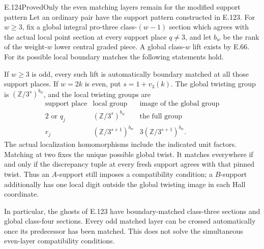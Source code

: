 \begin{result}{E.124}{Proved}{Only the even matching layers remain for the modified support pattern}
Let an ordinary pair have the support pattern constructed in E.123.
For $w\geq3$, fix a global integral pro-three class-$(w-1)$ section which agrees
with the actual local point section at every support place
$q\ne3$, and let $b_w$ be the rank of the weight-$w$ lower
central graded piece. A global class-$w$ lift exists by E.66.
For its possible local boundary matches the following statements
hold.

If $w\geq3$ is odd, every such lift is automatically boundary
matched at all those support places. If $w=2k$ is even, put
$s=1+v_3(k)$. The global twisting group is
$(\mathbb Z/3^s)^{b_w}$, and the local twisting groups are
\[
 \begin{array}{c|c|c}
 \text{support place}&\text{local group}&
     \text{image of the global group}\\ \hline
 2\text{ or }q_j&(\mathbb Z/3^s)^{b_w}&
          \text{the full group}\\
 r_j&(\mathbb Z/3^{s+1})^{b_w}&
          3(\mathbb Z/3^{s+1})^{b_w}.
 \end{array}
\]
The actual localization homomorphisms include the indicated
unit factors. Matching at two fixes the unique possible global
twist. It matches everywhere if and only if the discrepancy
tuple at every fresh support agrees with that pinned twist.
Thus an $A$-support still imposes a compatibility condition;
a $B$-support additionally has one local digit outside the
global twisting image in each Hall coordinate.

In particular, the ghosts of E.123 have boundary-matched
class-three sections and global class-four sections. Every
odd matched layer can be crossed automatically once its
predecessor has been matched. This does not solve the
simultaneous even-layer compatibility conditions.
\end{result}
